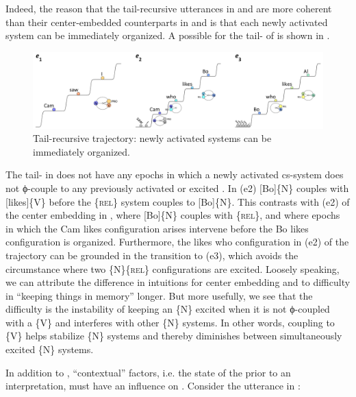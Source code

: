   Indeed, the reason that the tail-recursive utterances in  and  are more coherent than their center-embedded counterparts in  and  is that each newly activated system can be immediately organized. A possible  for the tail- of  is shown in {}. 

  
\begin{figure}
\includegraphics[width=\textwidth]{figures/Tilsen-img133.png}
\caption{Tail-recursive trajectory: newly activated systems can be immediately organized.}
\label{fig:6:14}
\end{figure}
 

  The tail- in {} does not have any epochs in which a newly activated cs-sys\-tem does not ϕ-couple to any previously activated or excited . In (e2) [Bo]\{N\} couples with [likes]\{V\} before the \{\textsc{rel}\} system couples to [Bo]\{N\}. This contrasts with (e2) of the center embedding in {}, where [Bo]\{N\} couples with \{\textsc{rel}\}, and where epochs in which the {\textbar}Cam likes{\textbar} configuration arises intervene before the {\textbar}Bo likes{\textbar} configuration is organized. Furthermore, the {\textbar}likes who{\textbar} configuration in (e2) of the  trajectory can be grounded in the transition to (e3), which avoids the circumstance where two \{N\}\{\textsc{rel}\} configurations are excited. Loosely speaking, we can attribute the difference in  intuitions for center embedding and  to difficulty in “keeping things in memory” longer. But more usefully, we see that the difficulty is the instability of keeping an \{N\} excited when it is not ϕ-coupled with a \{V\} and interferes with other \{N\} systems. In other words, coupling to \{V\} helps stabilize \{N\} systems and thereby diminishes  between simultaneously excited \{N\} systems.

  In addition to , “contextual” factors, i.e. the state of the  prior to an interpretation, must have an influence on . Consider the utterance in :

